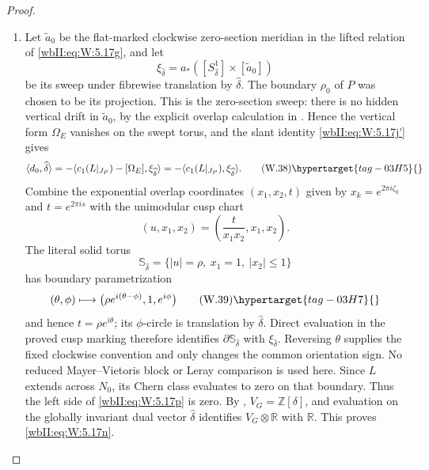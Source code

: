 \begin{proof}

\begin{enumerate}[label={$\langle1\rangle$\arabic*.},leftmargin=*]
\item Let $\widetilde a_0$ be the flat-marked clockwise zero-section meridian in
the lifted relation of \eqref{wbII:eq:W:5.17g}, and let
\[
 \xi_{\widehat\delta}
 =a_*([S^1_{\widehat\delta}]\times[\widetilde a_0])
\]
be its sweep under fibrewise translation by $\widehat\delta$.  The boundary
$\rho_0$ of $P$ was chosen to be its projection.  This is the zero-section
sweep: there is no hidden vertical drift in $\widetilde a_0$, by the
explicit overlap calculation in .  Hence the
vertical form $\Omega_E$ vanishes on the swept torus, and the slant identity
\eqref{wbII:eq:W:5.17j'} gives
\[
 \langle d_0,\widehat\delta\rangle
 =-\langle c_1(L|_{J_P})-[\Omega_E],
          \xi_{\widehat\delta}\rangle
 =-\langle c_1(L|_{J_P}),\xi_{\widehat\delta}\rangle.
\tag{W.38}\hypertarget{tag-03H5}{}\label{wbII:eq:W:5.17p}
\]
Combine the exponential overlap coordinates $(x_1,x_2,t)$ given by $x_k=e^{2\pi i\zeta_k}$ and $t=e^{2\pi is}$ with
the unimodular cusp chart
\[
 (u,x_1,x_2)=\left(\frac{t}{x_1x_2},x_1,x_2\right).
\]
The literal solid torus
\[
 \mathbb S_{\widehat\delta}
 =\{|u|=\rho,\ x_1=1,\ |x_2|\le1\}
\]
has boundary parametrization
\[
 (\theta,\phi)\longmapsto
 \bigl(\rho e^{i(\theta-\phi)},1,e^{i\phi}\bigr)
\tag{W.39}\hypertarget{tag-03H7}{}\label{wbII:eq:W:5.17p0}
\]
and hence $t=\rho e^{i\theta}$; its $\phi$-circle is translation by
$\widehat\delta$.  Direct evaluation in the proved cusp marking therefore
identifies $\partial\mathbb S_{\widehat\delta}$ with
$\xi_{\widehat\delta}$.  Reversing $\theta$ supplies the fixed clockwise
convention and only changes the common orientation sign.  No reduced
Mayer--Vietoris block or Leray comparison is used here.
Since $L$ extends across $N_0$, its Chern class evaluates to zero on that
boundary.  Thus the left side of \eqref{wbII:eq:W:5.17p} is zero.  By
, $V_G=\mathbb Z[\delta]$, and evaluation on the
globally invariant dual vector $\widehat\delta$ identifies
$V_G\otimes\mathbb R$ with $\mathbb R$.  This proves \eqref{wbII:eq:W:5.17n}.


\end{enumerate}
\end{proof}

